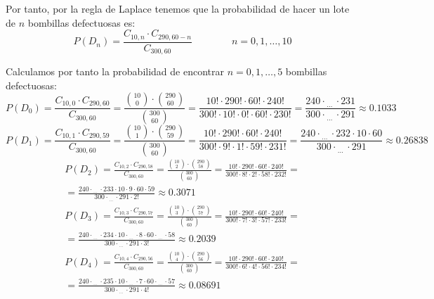 \begin{ejercicio}
    Por tanto, por la regla de Laplace tenemos que la probabilidad de hacer un lote de $n$ bombillas defectuosas es:
    \begin{equation*}
        P(D_n) = \frac{C_{10,n}\cdot C_{290,60-n}}{C_{300,60}} \qquad \qquad n=0,1,\dots,10
    \end{equation*}

    Calculamos por tanto la probabilidad de encontrar $n=0,1,\dots, 5$ bombillas defectuosas:
    \begin{equation*}
        P(D_0) = \frac{C_{10,0}\cdot C_{290,60}}{C_{300,60}} = \frac{\binom{10}{0}\cdot \binom{290}{60}}{\binom{300}{60}} = \frac{10!\cdot 290! \cdot 60! \cdot 240!}{300!\cdot 10!\cdot 0! \cdot 60! \cdot 230!} = \frac{240\cdot_{\; \dots} \cdot 231}{300\cdot_{\; \dots} \cdot 291} \approx 0.1033
    \end{equation*}
    \begin{equation*}
        P(D_1) = \frac{C_{10,1}\cdot C_{290,59}}{C_{300,60}} = \frac{\binom{10}{1}\cdot \binom{290}{59}}{\binom{300}{60}} = \frac{10!\cdot 290! \cdot 60! \cdot 240!}{300!\cdot 9!\cdot 1! \cdot 59! \cdot 231!} = \frac{240\cdot_{\; \dots} \cdot 232\cdot 10 \cdot 60}{300\cdot_{\; \dots} \cdot 291} \approx 0.26838
    \end{equation*}
    \begin{multline*}
        P(D_2) = \frac{C_{10,2}\cdot C_{290,58}}{C_{300,60}} = \frac{\binom{10}{2}\cdot \binom{290}{58}}{\binom{300}{60}} = \frac{10!\cdot 290! \cdot 60! \cdot 240!}{300!\cdot 8!\cdot 2! \cdot 58! \cdot 232!} =\\= \frac{240\cdot_{\; \dots} \cdot 233\cdot 10\cdot 9 \cdot 60\cdot 59}{300\cdot_{\; \dots} \cdot 291\cdot 2!} \approx 0.3071
    \end{multline*}
    \begin{multline*}
        P(D_3) = \frac{C_{10,3}\cdot C_{290,57}}{C_{300,60}} = \frac{\binom{10}{3}\cdot \binom{290}{57}}{\binom{300}{60}} = \frac{10!\cdot 290! \cdot 60! \cdot 240!}{300!\cdot 7!\cdot 3! \cdot 57! \cdot 233!} =\\= \frac{240\cdot_{\; \dots} \cdot 234\cdot 10\cdot_{\; \dots} \cdot 8 \cdot 60\cdot_{\; \dots} \cdot 58}{300\cdot_{\; \dots} \cdot 291\cdot 3!} \approx 0.2039
    \end{multline*}
    \begin{multline*}
        P(D_4) = \frac{C_{10,4}\cdot C_{290,56}}{C_{300,60}} = \frac{\binom{10}{4}\cdot \binom{290}{56}}{\binom{300}{60}} = \frac{10!\cdot 290! \cdot 60! \cdot 240!}{300!\cdot 6!\cdot 4! \cdot 56! \cdot 234!} =\\= \frac{240\cdot_{\; \dots} \cdot 235\cdot 10\cdot_{\; \dots} \cdot 7 \cdot 60\cdot_{\; \dots} \cdot 57}{300\cdot_{\; \dots} \cdot 291\cdot 4!} \approx 0.08691

\end{multline*}
\end{ejercicio}
